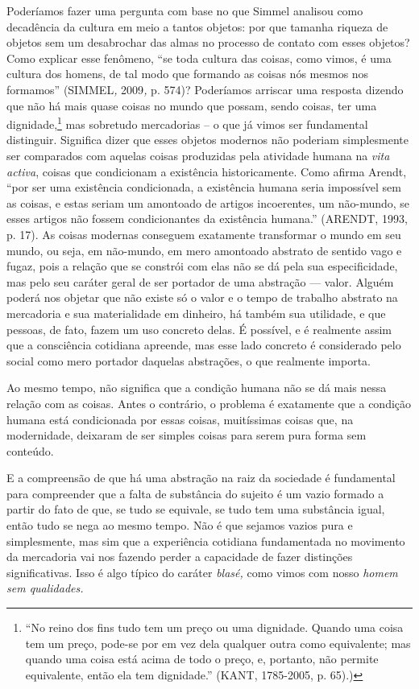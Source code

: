 Poderíamos fazer uma pergunta com base no que Simmel analisou como
decadência da cultura em meio a tantos objetos: por que tamanha riqueza
de objetos sem um desabrochar das almas no processo de contato com esses
objetos? Como explicar esse fenômeno, ``se toda cultura das coisas, como
vimos, é uma cultura dos homens, de tal modo que formando as coisas nós
mesmos nos formamos'' (SIMMEL\emph{,} 2009\emph{,} p. 574)? Poderíamos
arriscar uma resposta dizendo que não há mais quase coisas no mundo que
possam, sendo coisas, ter uma dignidade,\footnote{``No reino dos fins
  tudo tem um preço ou uma dignidade. Quando uma coisa tem um preço,
  pode-se por em vez dela qualquer outra como equivalente; mas quando
  uma coisa está acima de todo o preço, e, portanto, não permite
  equivalente, então ela tem dignidade.'' (KANT, 1785-2005, p. 65).)}
mas sobretudo mercadorias -- o que já vimos ser fundamental distinguir.
Significa dizer que esses objetos modernos não poderiam simplesmente ser
comparados com aquelas coisas produzidas pela atividade humana na
\emph{vita activa}, coisas que condicionam a existência historicamente.
Como afirma Arendt, ``por ser uma existência condicionada, a existência
humana seria impossível sem as coisas, e estas seriam um amontoado de
artigos incoerentes, um não-mundo, se esses artigos não fossem
condicionantes da existência humana.'' (ARENDT, 1993, p. 17). As coisas
modernas conseguem exatamente transformar o mundo em seu mundo, ou seja,
em não-mundo, em mero amontoado abstrato de sentido vago e fugaz, pois a
relação que se constrói com elas não se dá pela sua especificidade, mas
pelo seu caráter geral de ser portador de uma abstração --- valor.
Alguém poderá nos objetar que não existe só o valor e o tempo de
trabalho abstrato na mercadoria e sua materialidade em dinheiro, há
também sua utilidade, e que pessoas, de fato, fazem um uso concreto
delas. É possível, e é realmente assim que a consciência cotidiana
apreende, mas esse lado concreto é considerado pelo social como mero
portador daquelas abstrações, o que realmente importa.

Ao mesmo tempo, não significa que a condição humana não se dá mais nessa
relação com as coisas. Antes o contrário, o problema é exatamente que a
condição humana está condicionada por essas coisas, muitíssimas coisas
que, na modernidade, deixaram de ser simples coisas para serem pura
forma sem conteúdo.

E a compreensão de que há uma abstração na raiz da sociedade é
fundamental para compreender que a falta de substância do sujeito é um
vazio formado a partir do fato de que, se tudo se equivale, se tudo tem
uma substância igual, então tudo se nega ao mesmo tempo. Não é que
sejamos vazios pura e simplesmente, mas sim que a experiência cotidiana
fundamentada no movimento da mercadoria vai nos fazendo perder a
capacidade de fazer distinções significativas. Isso é algo típico do
caráter \emph{blasé,} como vimos com nosso \emph{homem sem qualidades.}

